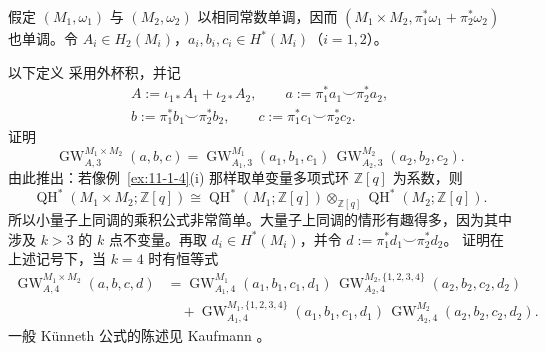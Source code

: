 \begin{exercise}[Künneth 公式]\label{ex:11-1-19}
假定 $(M_1,\omega_1)$ 与 $(M_2,\omega_2)$ 以相同常数单调，因而
$(M_1\times M_2,\pi_1^*\omega_1+\pi_2^*\omega_2)$ 也单调。令
$A_i\in H_2(M_i)$，$a_i,b_i,c_i\in H^*(M_i)$（$i=1,2$）。

以下定义
采用外杯积，并记
\[
\begin{gathered}
  A:=\iota_{1*}A_1+\iota_{2*}A_2,\qquad
  a:=\pi_1^*a_1\smile\pi_2^*a_2,\\
  b:=\pi_1^*b_1\smile\pi_2^*b_2,\qquad
  c:=\pi_1^*c_1\smile\pi_2^*c_2.
\end{gathered}
\]
证明
\[
  \operatorname{GW}_{A,3}^{M_1\times M_2}(a,b,c)
  =\operatorname{GW}_{A_1,3}^{M_1}(a_1,b_1,c_1)\,
   \operatorname{GW}_{A_2,3}^{M_2}(a_2,b_2,c_2).
\]
由此推出：若像例~\ref{ex:11-1-4}(i) 那样取单变量多项式环 $\mathbb Z[q]$ 为系数，则
\[
  \operatorname{QH}^*(M_1\times M_2;\mathbb Z[q])
  \cong
  \operatorname{QH}^*(M_1;\mathbb Z[q])
  \otimes_{\mathbb Z[q]}
  \operatorname{QH}^*(M_2;\mathbb Z[q]).
\]
所以小量子上同调的乘积公式非常简单。大量子上同调的情形有趣得多，因为其中涉及
$k>3$ 的 $k$ 点不变量。再取 $d_i\in H^*(M_i)$，并令
$d:=\pi_1^*d_1\smile\pi_2^*d_2$。
证明在上述记号下，当 $k=4$ 时有恒等式
\[
\begin{aligned}
  \operatorname{GW}_{A,4}^{M_1\times M_2}(a,b,c,d)
  &=
  \operatorname{GW}_{A_1,4}^{M_1}(a_1,b_1,c_1,d_1)\,
  \operatorname{GW}_{A_2,4}^{M_2,\{1,2,3,4\}}(a_2,b_2,c_2,d_2)\\
  &\quad+
  \operatorname{GW}_{A_1,4}^{M_1,\{1,2,3,4\}}(a_1,b_1,c_1,d_1)\,
  \operatorname{GW}_{A_2,4}^{M_2}(a_2,b_2,c_2,d_2).
\end{aligned}
\]
一般 Künneth 公式的陈述见 Kaufmann 。
\end{exercise}

